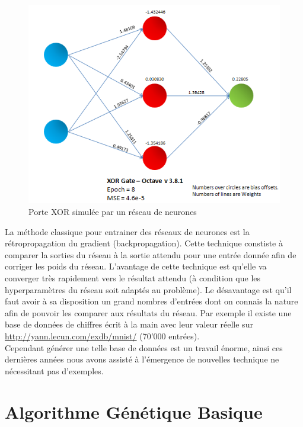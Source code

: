 \documentclass{article}
\begin{document}
\begin{figure}[h]
\begin{center}
	\includegraphics[scale=0.5]{"XOR_Gate.png"} 
	\caption{Porte XOR simulée par un réseau de neurones}
\end{center}
\end{figure}

La méthode classique pour entrainer des réseaux de neurones est la rétropropagation du gradient (backpropagation). Cette technique constiste à comparer la sorties du réseau à la sortie attendu pour une entrée donnée afin de corriger les poids du réseau. L'avantage de cette technique est qu'elle va converger très rapidement vers le résultat attendu (à condition que les hyperparamètres du réseau soit adaptés au problème). Le désavantage est qu'il faut avoir à sa disposition un grand nombres d'entrées dont on connais la nature afin de pouvoir les comparer aux résultats du réseau. Par exemple il existe une base de données de chiffres écrit à la main avec leur valeur réelle sur \url{http://yann.lecun.com/exdb/mnist/} (70'000 entrées).\\

Cependant générer une telle base de données est un travail énorme, ainsi ces dernières années nous avons assisté à l'émergence de nouvelles technique ne nécessitant pas d'exemples.

\section{Algorithme Génétique Basique}
\end{document}
